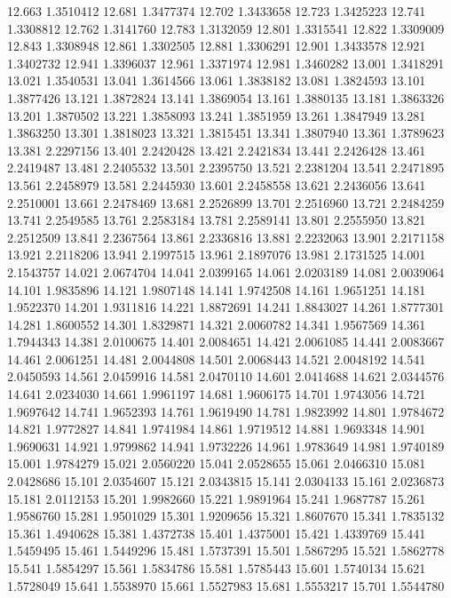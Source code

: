 12.663 1.3510412
12.681 1.3477374
12.702 1.3433658
12.723 1.3425223
12.741 1.3308812
12.762 1.3141760
12.783 1.3132059
12.801 1.3315541
12.822 1.3309009
12.843 1.3308948
12.861 1.3302505
12.881 1.3306291
12.901 1.3433578
12.921 1.3402732
12.941 1.3396037
12.961 1.3371974
12.981 1.3460282
13.001 1.3418291
13.021 1.3540531
13.041 1.3614566
13.061 1.3838182
13.081 1.3824593
13.101 1.3877426
13.121 1.3872824
13.141 1.3869054
13.161 1.3880135
13.181 1.3863326
13.201 1.3870502
13.221 1.3858093
13.241 1.3851959
13.261 1.3847949
13.281 1.3863250
13.301 1.3818023
13.321 1.3815451
13.341 1.3807940
13.361 1.3789623
13.381 2.2297156
13.401 2.2420428
13.421 2.2421834
13.441 2.2426428
13.461 2.2419487
13.481 2.2405532
13.501 2.2395750
13.521 2.2381204
13.541 2.2471895
13.561 2.2458979
13.581 2.2445930
13.601 2.2458558
13.621 2.2436056
13.641 2.2510001
13.661 2.2478469
13.681 2.2526899
13.701 2.2516960
13.721 2.2484259
13.741 2.2549585
13.761 2.2583184
13.781 2.2589141
13.801 2.2555950
13.821 2.2512509
13.841 2.2367564
13.861 2.2336816
13.881 2.2232063
13.901 2.2171158
13.921 2.2118206
13.941 2.1997515
13.961 2.1897076
13.981 2.1731525
14.001 2.1543757
14.021 2.0674704
14.041 2.0399165
14.061 2.0203189
14.081 2.0039064
14.101 1.9835896
14.121 1.9807148
14.141 1.9742508
14.161 1.9651251
14.181 1.9522370
14.201 1.9311816
14.221 1.8872691
14.241 1.8843027
14.261 1.8777301
14.281 1.8600552
14.301 1.8329871
14.321 2.0060782
14.341 1.9567569
14.361 1.7944343
14.381 2.0100675
14.401 2.0084651
14.421 2.0061085
14.441 2.0083667
14.461 2.0061251
14.481 2.0044808
14.501 2.0068443
14.521 2.0048192
14.541 2.0450593
14.561 2.0459916
14.581 2.0470110
14.601 2.0414688
14.621 2.0344576
14.641 2.0234030
14.661 1.9961197
14.681 1.9606175
14.701 1.9743056
14.721 1.9697642
14.741 1.9652393
14.761 1.9619490
14.781 1.9823992
14.801 1.9784672
14.821 1.9772827
14.841 1.9741984
14.861 1.9719512
14.881 1.9693348
14.901 1.9690631
14.921 1.9799862
14.941 1.9732226
14.961 1.9783649
14.981 1.9740189
15.001 1.9784279
15.021 2.0560220
15.041 2.0528655
15.061 2.0466310
15.081 2.0428686
15.101 2.0354607
15.121 2.0343815
15.141 2.0304133
15.161 2.0236873
15.181 2.0112153
15.201 1.9982660
15.221 1.9891964
15.241 1.9687787
15.261 1.9586760
15.281 1.9501029
15.301 1.9209656
15.321 1.8607670
15.341 1.7835132
15.361 1.4940628
15.381 1.4372738
15.401 1.4375001
15.421 1.4339769
15.441 1.5459495
15.461 1.5449296
15.481 1.5737391
15.501 1.5867295
15.521 1.5862778
15.541 1.5854297
15.561 1.5834786
15.581 1.5785443
15.601 1.5740134
15.621 1.5728049
15.641 1.5538970
15.661 1.5527983
15.681 1.5553217
15.701 1.5544780
